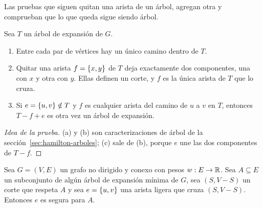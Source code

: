 \documentclass[11pt,letterpaper]{article}
\begin{document}
Las pruebas que siguen quitan una arista de un árbol, agregan otra y
comprueban que lo que queda sigue siendo árbol.

\begin{lema}
  \label{lem:hechos-arboles-mst}
  Sea $T$ un árbol de expansión de $G$.
  \begin{enumerate}[label=(\alph*), itemsep=0.1em]
    \item Entre cada par de vértices hay un único camino dentro de
          $T$.
    \item Quitar una arista $f = \left\{ x, y \right\}$ de $T$ deja exactamente
          dos componentes, una con $x$ y otra con $y$. Ellas definen
          un corte, y $f$ es la única arista de $T$ que lo cruza.
    \item Si $e = \left\{ u, v \right\} \notin T$ y $f$ es cualquier arista del
          camino de $u$ a $v$ en $T$, entonces $T - f + e$ es otra vez
          un árbol de expansión.
  \end{enumerate}
\end{lema}

\begin{proof}[Idea de la prueba]
  (a) y (b) son caracterizaciones de árbol de la
  sección~\ref{sec:hamilton-arboles}; (c) sale de (b), porque $e$ une
  las dos componentes de $T - f$.
\end{proof}

\begin{teorema}
  \label{teo:propiedad-corte}
  Sea $G = (V, E)$ un grafo no dirigido y conexo con pesos
  $w : E \to \mathbb{R}$. Sea $A \subseteq E$ un subconjunto de algún árbol de
  expansión mínima de $G$, sea $(S, V - S)$ un corte que respeta $A$ y
  sea $e = \left\{ u, v \right\}$ una arista ligera que cruza $(S, V - S)$.
  Entonces $e$ es segura para $A$.
\end{teorema}
\end{document}
